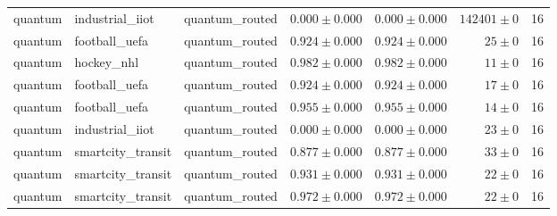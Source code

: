 \begin{table}[htbp]
\begin{tabular}{l l l r r r r}
quantum & industrial\_iiot & quantum\_routed & $0.000\pm0.000$ & $0.000\pm0.000$ & $142401\pm0$ & 16 \\
quantum & football\_uefa & quantum\_routed & $0.924\pm0.000$ & $0.924\pm0.000$ & $25\pm0$ & 16 \\
quantum & hockey\_nhl & quantum\_routed & $0.982\pm0.000$ & $0.982\pm0.000$ & $11\pm0$ & 16 \\
quantum & football\_uefa & quantum\_routed & $0.924\pm0.000$ & $0.924\pm0.000$ & $17\pm0$ & 16 \\
quantum & football\_uefa & quantum\_routed & $0.955\pm0.000$ & $0.955\pm0.000$ & $14\pm0$ & 16 \\
quantum & industrial\_iiot & quantum\_routed & $0.000\pm0.000$ & $0.000\pm0.000$ & $23\pm0$ & 16 \\
quantum & smartcity\_transit & quantum\_routed & $0.877\pm0.000$ & $0.877\pm0.000$ & $33\pm0$ & 16 \\
quantum & smartcity\_transit & quantum\_routed & $0.931\pm0.000$ & $0.931\pm0.000$ & $22\pm0$ & 16 \\
quantum & smartcity\_transit & quantum\_routed & $0.972\pm0.000$ & $0.972\pm0.000$ & $22\pm0$ & 16 \\
\hline
\end{tabular}
\end{table}
